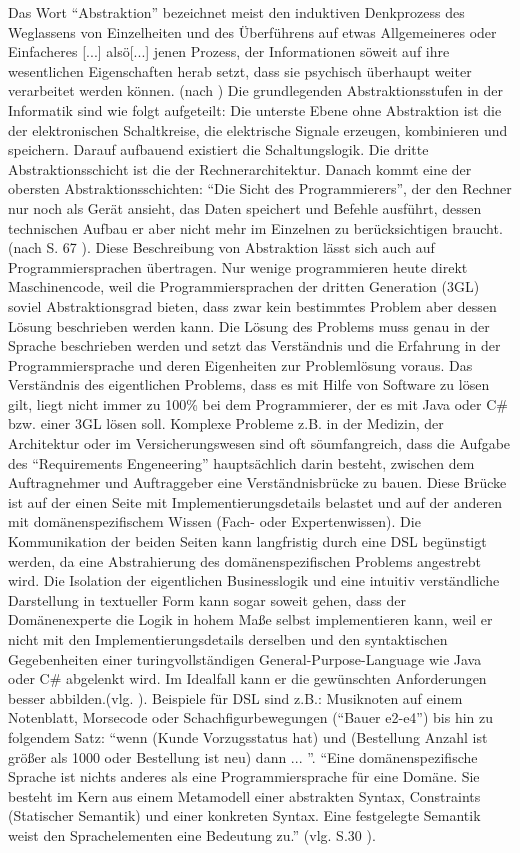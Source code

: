 \documentclass[11pt,english,ngerman, headsepline]{scrreprt}
\begin{document}
Das Wort “Abstraktion” bezeichnet meist den induktiven Denkprozess des
Weglassens von Einzelheiten und des Überführens auf etwas Allgemeineres oder
Einfacheres [...] alsö[...] jenen Prozess, der Informationen söweit auf ihre
wesentlichen Eigenschaften herab setzt, dass sie psychisch überhaupt weiter
verarbeitet werden können. (nach \cite{wikiAbsraktion}) Die grundlegenden
Abstraktionsstufen in der Informatik sind wie folgt aufgeteilt: Die unterste
Ebene ohne Abstraktion ist die der elektronischen Schaltkreise, die elektrische
Signale erzeugen, kombinieren und speichern. Darauf aufbauend existiert die
Schaltungslogik. Die dritte Abstraktionsschicht ist die der Rechnerarchitektur.
Danach kommt eine der obersten Abstraktionsschichten: “Die Sicht des
Programmierers”, der den Rechner nur noch als Gerät ansieht, das Daten speichert
und Befehle ausführt, dessen technischen Aufbau er aber nicht mehr im Einzelnen
zu berücksichtigen braucht. (nach S. 67 \cite{rechenberg2000informatik}). Diese
Beschreibung von Abstraktion lässt sich auch auf Programmiersprachen übertragen.
Nur wenige programmieren heute direkt Maschinencode, weil die
Programmiersprachen der dritten Generation (3GL) soviel Abstraktionsgrad bieten,
dass zwar kein bestimmtes Problem aber dessen Lösung beschrieben werden kann.
Die Lösung des Problems muss genau in der Sprache beschrieben werden und setzt
das Verständnis und die Erfahrung in der Programmiersprache und deren
Eigenheiten zur Problemlösung voraus. Das Verständnis des eigentlichen Problems,
dass es mit Hilfe von Software zu lösen gilt, liegt nicht immer zu 100\% bei dem
Programmierer, der es mit Java oder C\# bzw. einer 3GL lösen soll. Komplexe
Probleme z.B. in der Medizin, der Architektur oder im Versicherungswesen sind
oft söumfangreich, dass die Aufgabe des “Requirements Engeneering”
hauptsächlich darin besteht, zwischen dem Auftragnehmer und Auftraggeber eine
Verständnisbrücke zu bauen. Diese Brücke ist auf der einen Seite mit
Implementierungsdetails belastet und auf der anderen mit domänenspezifischem
Wissen (Fach- oder Expertenwissen). Die Kommunikation der beiden Seiten kann
langfristig durch eine DSL begünstigt werden, da eine Abstrahierung des
domänenspezifischen Problems angestrebt wird. Die Isolation der eigentlichen
Businesslogik und eine intuitiv verständliche Darstellung in textueller Form
kann sogar soweit gehen, dass der Domänenexperte die Logik in hohem Maße selbst
implementieren kann, weil er nicht mit den Implementierungsdetails derselben und
den syntaktischen Gegebenheiten einer turingvollständigen
General-Purpose-Language wie Java oder C\# abgelenkt wird. Im Idealfall kann er
die gewünschten Anforderungen besser abbilden.(vlg. \cite{heiseMPS2}). Beispiele
für DSL sind z.B.: Musiknoten auf einem Notenblatt, Morsecode oder
Schachfigurbewegungen (“Bauer e2-e4”) bis hin zu folgendem Satz: “wenn (Kunde
Vorzugsstatus hat) und (Bestellung Anzahl ist größer als 1000 oder Bestellung
ist neu) dann ... ”. “Eine domänenspezifische Sprache ist nichts anderes als
eine Programmiersprache für eine Domäne. Sie besteht im Kern aus einem
Metamodell einer abstrakten Syntax, Constraints (Statischer Semantik) und einer
konkreten Syntax. Eine festgelegte Semantik weist den Sprachelementen eine
Bedeutung zu.” (vlg. S.30 \cite{mdaDPunkt}). 
\end{document}
